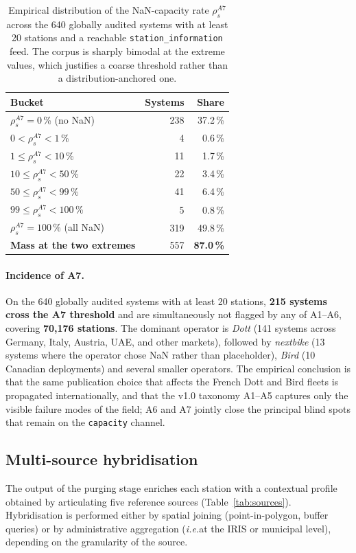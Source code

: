 \documentclass[11pt,a4paper]{article}
\newcommand{\ie}{\emph{i.e.}}
\begin{document}
\begin{table}[ht]
\centering
\caption{Empirical distribution of the NaN-capacity rate
$\rho_s^{A7}$ across the 640 globally audited systems with at least
20 stations and a reachable \texttt{station\_information} feed.
The corpus is sharply bimodal at the extreme values, which justifies
a coarse threshold rather than a distribution-anchored one.}
\label{tab:a7-distribution}
\small
\begin{tabular}{@{}lrr@{}}
\toprule
\textbf{Bucket} & \textbf{Systems} & \textbf{Share}\\
\midrule
$\rho_s^{A7} = 0$\,\% (no NaN)        & 238 & 37.2\,\% \\
$0 < \rho_s^{A7} < 1$\,\%              &   4 &  0.6\,\% \\
$1 \leq \rho_s^{A7} < 10$\,\%          &  11 &  1.7\,\% \\
$10 \leq \rho_s^{A7} < 50$\,\%         &  22 &  3.4\,\% \\
$50 \leq \rho_s^{A7} < 99$\,\%         &  41 &  6.4\,\% \\
$99 \leq \rho_s^{A7} < 100$\,\%        &   5 &  0.8\,\% \\
$\rho_s^{A7} = 100$\,\% (all NaN)      & 319 & 49.8\,\% \\
\midrule
\textbf{Mass at the two extremes} & 557 & \textbf{87.0\,\%} \\
\bottomrule
\end{tabular}
\end{table}

\paragraph{Incidence of A7.}
On the 640 globally audited systems with at least 20 stations,
\textbf{215 systems cross the A7 threshold} and are simultaneously
not flagged by any of A1--A6, covering \textbf{70{,}176 stations}.
The dominant operator is \emph{Dott} (141 systems across Germany,
Italy, Austria, UAE, and other markets), followed by
\emph{nextbike} (13 systems where the operator chose NaN rather
than placeholder), \emph{Bird} (10 Canadian deployments) and
several smaller operators. The empirical conclusion is that the
same publication choice that affects the French Dott and Bird
fleets is propagated internationally, and that the v1.0 taxonomy
A1--A5 captures only the visible failure modes of the field; A6
and A7 jointly close the principal blind spots that remain on the
\texttt{capacity} channel.

\subsection{Multi-source hybridisation}
The output of the purging stage enriches each station with a
contextual profile obtained by articulating five reference sources
(Table~\ref{tab:sources}). Hybridisation is performed either by
spatial joining (point-in-polygon, buffer queries) or by administrative
aggregation (\ie at the IRIS or municipal level), depending on the
granularity of the source.
\end{document}
